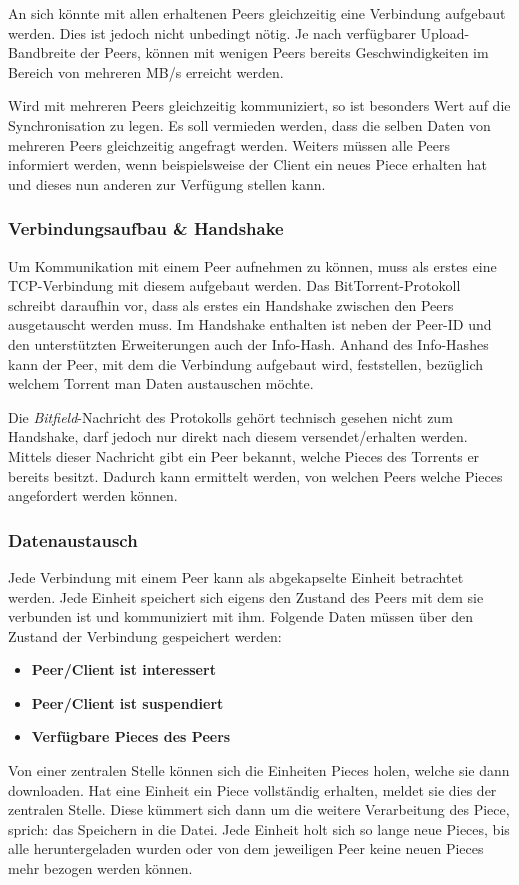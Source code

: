 An sich könnte mit allen erhaltenen Peers gleichzeitig eine Verbindung aufgebaut werden. Dies ist jedoch nicht unbedingt nötig. Je nach verfügbarer Upload-Bandbreite der Peers, können mit wenigen Peers bereits Geschwindigkeiten im Bereich von mehreren MB/s erreicht werden. 

Wird mit mehreren Peers gleichzeitig kommuniziert, so ist besonders Wert auf die Synchronisation zu legen. Es soll vermieden werden, dass die selben Daten von mehreren Peers gleichzeitig angefragt werden. Weiters müssen alle Peers informiert werden, wenn beispielsweise der Client ein neues Piece erhalten hat und dieses nun anderen zur Verfügung stellen kann.

\subsubsection{Verbindungsaufbau \& Handshake}

Um Kommunikation mit einem Peer aufnehmen zu können, muss als erstes eine TCP-Verbindung mit diesem aufgebaut werden. Das BitTorrent-Protokoll schreibt daraufhin vor, dass als erstes ein Handshake zwischen den Peers ausgetauscht werden muss. Im Handshake enthalten ist neben der Peer-ID und den unterstützten Erweiterungen auch der Info-Hash. Anhand des Info-Hashes kann der Peer, mit dem die Verbindung aufgebaut wird, feststellen, bezüglich welchem Torrent man Daten austauschen möchte.

Die \emph{Bitfield}-Nachricht des Protokolls gehört technisch gesehen nicht zum Handshake, darf jedoch nur direkt nach diesem versendet/erhalten werden. Mittels dieser Nachricht gibt ein Peer bekannt, welche Pieces des Torrents er bereits besitzt. Dadurch kann ermittelt werden, von welchen Peers welche Pieces angefordert werden können.

\subsubsection{Datenaustausch}

Jede Verbindung mit einem Peer kann als abgekapselte Einheit betrachtet werden. Jede Einheit speichert sich eigens den Zustand des Peers mit dem sie verbunden ist und kommuniziert mit ihm. Folgende Daten müssen über den Zustand der Verbindung gespeichert werden:
\begin{itemize}
    \item \textbf{Peer/Client ist interessert}
    \item \textbf{Peer/Client ist suspendiert}
    \item \textbf{Verfügbare Pieces des Peers}
\end{itemize}
Von einer zentralen Stelle können sich die Einheiten Pieces holen, welche sie dann down\-loaden. Hat eine Einheit ein Piece vollständig erhalten, meldet sie dies der zentralen Stelle. Diese kümmert sich dann um die weitere Verarbeitung des Piece, sprich: das Speichern in die Datei. 
Jede Einheit holt sich so lange neue Pieces, bis alle heruntergeladen wurden oder von dem jeweiligen Peer keine neuen Pieces mehr bezogen werden können. 

